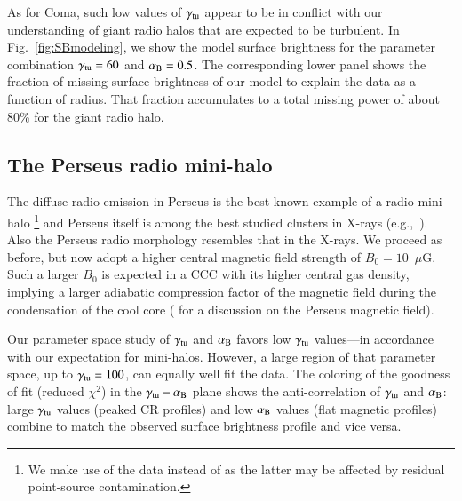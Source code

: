 \documentclass[useAMS,usenatbib]{mn2e}
\begin{document}
As for Coma, such low values of $\gamma_{{\mathrm{tu}}}$ appear to be in conflict
with our understanding of giant radio halos that are expected to be
turbulent. In Fig.~\ref{fig:SBmodeling}, we show the model surface brightness
for the parameter combination $\gamma_{{\mathrm{tu}}} = 60$ and
$\alpha_{{\mathrm{B}}}=0.5$. The corresponding lower panel shows the fraction
of missing surface brightness of our model to explain the data as a function of
radius. That fraction accumulates to a total missing power of about 80\% for the
giant radio halo.


\subsection{The Perseus radio mini-halo}

The diffuse radio emission in Perseus is the best known example of a radio
mini-halo \citep{1990MNRAS.246..477P}\footnote{We make use of the
  \citet{1990MNRAS.246..477P} data instead of \citet{Sijbring1993} as the latter
  may be affected by residual point-source contamination.}  and Perseus itself
is among the best studied clusters in X-rays
(e.g.,~\citealp{2003ApJ...590..225C,2006MNRAS.366..417F,2011arXiv1105.5025F}). Also
the Perseus radio morphology resembles that in the X-rays. We proceed as before,
but now adopt a higher central magnetic field strength of
$B_{0}=10$~$\mu$G. Such a larger $B_0$ is expected in a CCC with its higher
central gas density, implying a larger adiabatic compression factor of the
magnetic field during the condensation of the cool core
(\citealp{2010ApJ...710..634A,2011arXiv1111.5544M} for a discussion on the
Perseus magnetic field).

Our parameter space study of $\gamma_{{\mathrm{tu}}}$ and $\alpha_{{\mathrm{B}}}$ favors
low $\gamma_{{\mathrm{tu}}}$ values---in accordance with our expectation for
mini-halos. However, a large region of that parameter space, up to
$\gamma_{{\mathrm{tu}}} = 100$, can equally well fit the data. The coloring of the
goodness of fit (reduced $\chi^2$) in the $\gamma_{{\mathrm{tu}}}-\alpha_{{\mathrm{B}}}$
plane shows the anti-correlation of $\gamma_{{\mathrm{tu}}}$ and $\alpha_{{\mathrm{B}}}$:
large $\gamma_{{\mathrm{tu}}}$ values (peaked CR profiles) and low $\alpha_{{\mathrm{B}}}$
values (flat magnetic profiles) combine to match the observed surface brightness
profile and vice versa.
\end{document}

